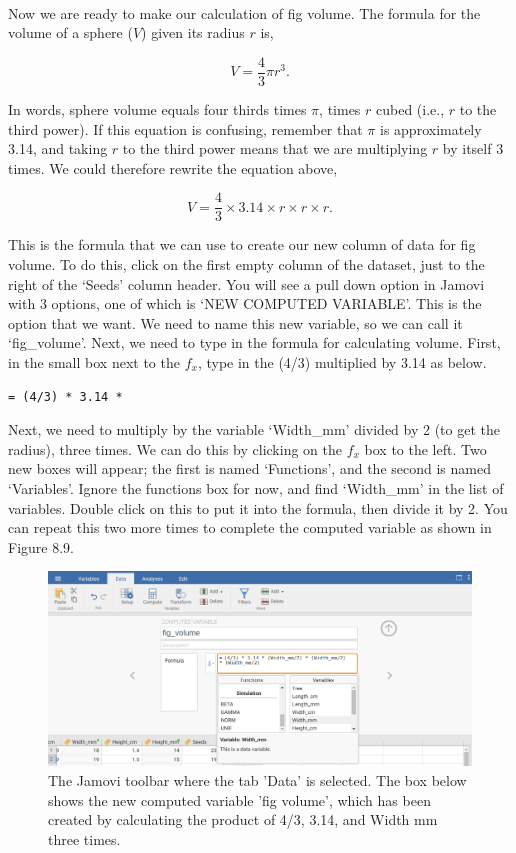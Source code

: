 \documentclass[
]{scrbook}
\begin{document}
\begin{verbatim}




\end{verbatim}

Now we are ready to make our calculation of fig volume.
The formula for the volume of a sphere (\(V\)) given its radius \(r\) is,

\[V = \frac{4}{3} \pi r^{3}.\]

In words, sphere volume equals four thirds times \(\pi\), times \(r\) cubed (i.e., \(r\) to the third power).
If this equation is confusing, remember that \(\pi\) is approximately 3.14, and taking \(r\) to the third power means that we are multiplying \(r\) by itself 3 times.
We could therefore rewrite the equation above,

\[V = \frac{4}{3} \times 3.14 \times r \times r \times r.\]

This is the formula that we can use to create our new column of data for fig volume.
To do this, click on the first empty column of the dataset, just to the right of the `Seeds' column header.
You will see a pull down option in Jamovi with 3 options, one of which is `NEW COMPUTED VARIABLE'.
This is the option that we want.
We need to name this new variable, so we can call it `fig\_volume'.
Next, we need to type in the formula for calculating volume.
First, in the small box next to the \(f_{x}\), type in the (4/3) multiplied by 3.14 as below.

\begin{verbatim}
= (4/3) * 3.14 *
\end{verbatim}

Next, we need to multiply by the variable `Width\_mm' divided by 2 (to get the radius), three times. We can do this by clicking on the \(f_{x}\) box to the left.
Two new boxes will appear; the first is named `Functions', and the second is named `Variables'.
Ignore the functions box for now, and find `Width\_mm' in the list of variables.
Double click on this to put it into the formula, then divide it by 2.
You can repeat this two more times to complete the computed variable as shown in Figure 8.9.

\begin{figure}
\includegraphics[width=1\linewidth]{img/jamovi_compute_new_variable} \caption{The Jamovi toolbar where the tab 'Data' is selected. The box below shows the new computed variable 'fig volume', which has been created by calculating the product of 4/3, 3.14, and Width mm three times.}\label{fig:unnamed-chunk-30}
\end{figure}
\end{document}
